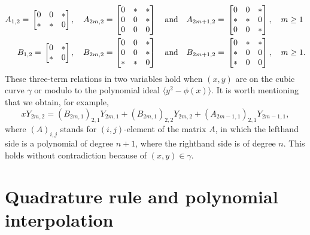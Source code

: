 \documentclass{amsart}
\theoremstyle{remark}
\def\la{{\langle}}
\def\ra{{\rangle}}
\def\g{{\gamma}}
\def\la{{\langle}}
\def\ra{{\rangle}}
\begin{document}
\begin{align*}
 A_{1,2}  = \, \left[\begin{matrix} 0& 0 & \ast \\ \ast & \ast & 0  \end{matrix}\right],
  \quad A_{2m,2}  = & \, \left[\begin{matrix} 0 & \ast & \ast \\ 0 & 0 & \ast \\ 0 & 0 & 0  \end{matrix}\right] 
\quad \hbox{and}\quad 
A_{2m+1,2}  =  \, \left[\begin{matrix} 0 & 0 & \ast \\ \ast & \ast & 0 \\ 0 & 0 & \ast  \end{matrix}\right],\quad m \ge 1 \\
B_{1,2}  =  \, \left[\begin{matrix} 0 & \ast \\ \ast & 0  \end{matrix}\right], \quad 
B_{2m,2} = & \, \left[\begin{matrix} 0& 0 & \ast \\ 0 & 0 &\ast \\ \ast & \ast & 0  \end{matrix}\right]
\quad \hbox{and}\quad 
B_{2m+1,2}  =  \, \left[\begin{matrix} 0 & \ast & \ast \\ \ast & 0 & 0 \\ \ast & 0 & 0 \end{matrix}\right], \quad m \ge 1. 
\end{align*}
These three-term relations in two variables hold when $(x,y)$ are on the cubic curve $\g$ or modulo to the 
polynomial ideal $\la y^2-\phi(x)\ra$. It is worth mentioning that we obtain, for example, 
$$
  x Y_{2m,2} = (B_{2m,1})_{2,1} Y_{2m,1} + (B_{2m,1})_{2,2} Y_{2m,2} + (A_{2m-1,1})_{2,1} Y_{2m-1,1},
$$
where $(A)_{i,j}$ stands for $(i,j)$-element of the matrix $A$, in which the lefthand side is a polynomial
of degree $n+1$, where the righthand side is of degree $n$. This holds without contradiction because 
of $(x,y) \in \g$.  

\section{Quadrature rule and polynomial interpolation}
\setcounter{equation}{0}
\end{document}
